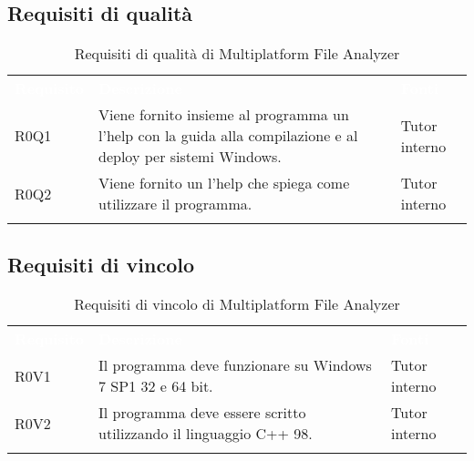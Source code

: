 	\subsection{Requisiti di qualità}
		\begin{center}
			\begin{longtable}{p{4.2cm}!{\color{white}\vrule width 0.5mm}p{6cm}!{\color{white}\vrule width 0.5mm}p{2.5cm}!{\color{white}\vrule width 0.5mm}}
				\textcolor{white}{\textbf{Requisito}}&\textcolor{white}{\textbf{Descrizione}}&\textcolor{white}{\textbf{Fonti}}\\
				
				\hspace{0mm}\hypertarget{R0Q1}{R0Q1} & Viene fornito insieme al programma un l'help con la guida alla compilazione e al deploy per sistemi Windows. & Tutor interno\\
				
				\hspace{0mm}\hypertarget{R0Q2}{R0Q2} & Viene fornito un l'help che spiega come utilizzare il programma. & Tutor interno\\
				
				\hline
				\caption{Requisiti di qualità di Multiplatform File Analyzer}
			\end{longtable}
		\end{center}

	\subsection{Requisiti di vincolo}
		\begin{center}
			\begin{longtable}{p{4.2cm}!{\color{white}\vrule width 0.5mm}p{6cm}!{\color{white}\vrule width 0.5mm}p{2.5cm}!{\color{white}\vrule width 0.5mm}}
				\textcolor{white}{\textbf{Requisito}}&\textcolor{white}{\textbf{Descrizione}}&\textcolor{white}{\textbf{Fonti}}\\
				
				\hspace{0mm}\hypertarget{R0V1}{R0V1} & Il programma deve funzionare su Windows 7 SP1 32 e 64 bit. & Tutor interno\\
				
				\hspace{0mm}\hypertarget{R0V2}{R0V2} & Il programma deve essere scritto utilizzando il linguaggio C++ 98. & Tutor interno\\
				
				\hline
				\caption{Requisiti di vincolo di Multiplatform File Analyzer}
			\end{longtable}
		\end{center}
		
